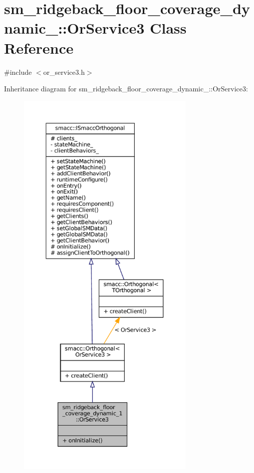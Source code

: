 \hypertarget{classsm__ridgeback__floor__coverage__dynamic__1_1_1OrService3}{}\section{sm\+\_\+ridgeback\+\_\+floor\+\_\+coverage\+\_\+dynamic\+\_\+:\+:Or\+Service3 Class Reference}
\label{classsm__ridgeback__floor__coverage__dynamic__1_1_1OrService3}


{\ttfamily \#include $<$or\+\_\+service3.\+h$>$}



Inheritance diagram for sm\+\_\+ridgeback\+\_\+floor\+\_\+coverage\+\_\+dynamic\+\_\+:\+:Or\+Service3\+:
\nopagebreak
\begin{figure}[H]
\begin{center}
\leavevmode
\includegraphics[height=550pt]{classsm__ridgeback__floor__coverage__dynamic__1_1_1OrService3__inherit__graph}
\end{center}
\end{figure}


